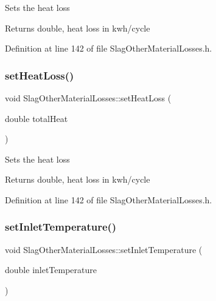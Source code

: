Sets the heat loss \begin{DoxyReturn}{Returns}
double, heat loss in kwh/cycle 
\end{DoxyReturn}


Definition at line 142 of file Slag\+Other\+Material\+Losses.\+h.

\mbox{\label{class_slag_other_material_losses_a33d59aed5492ec2912615e93b6ff273e}} 
\subsubsection{\texorpdfstring{set\+Heat\+Loss()}{setHeatLoss()}\hspace{0.1cm}{\footnotesize\ttfamily [3/3]}}
{\footnotesize\ttfamily void Slag\+Other\+Material\+Losses\+::set\+Heat\+Loss (\begin{DoxyParamCaption}\item[{double}]{total\+Heat }\end{DoxyParamCaption})\hspace{0.3cm}{\ttfamily [inline]}}

Sets the heat loss \begin{DoxyReturn}{Returns}
double, heat loss in kwh/cycle 
\end{DoxyReturn}


Definition at line 142 of file Slag\+Other\+Material\+Losses.\+h.

\mbox{\label{class_slag_other_material_losses_a47bb0a61de501e3e9b7bd2bf2651eb8c}} 
\subsubsection{\texorpdfstring{set\+Inlet\+Temperature()}{setInletTemperature()}\hspace{0.1cm}{\footnotesize\ttfamily [1/3]}}
{\footnotesize\ttfamily void Slag\+Other\+Material\+Losses\+::set\+Inlet\+Temperature (\begin{DoxyParamCaption}\item[{double}]{inlet\+Temperature }\end{DoxyParamCaption})\hspace{0.3cm}{\ttfamily [inline]}}

